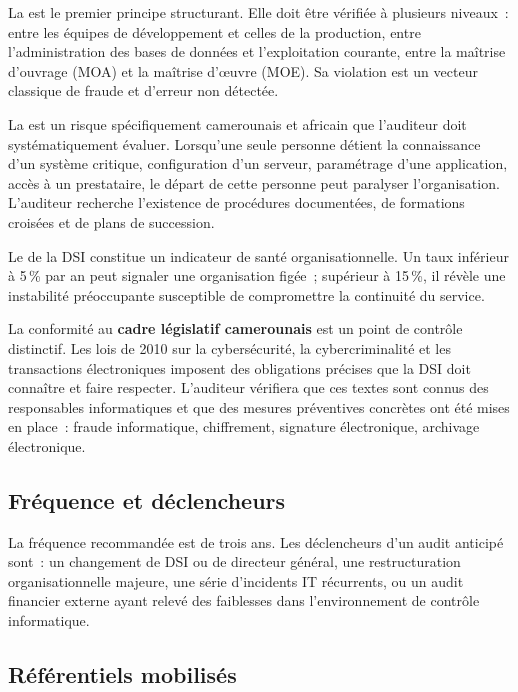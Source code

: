 La  est le premier principe structurant. Elle doit
être vérifiée à plusieurs niveaux~: entre les équipes de développement et celles
de la production, entre l'administration des bases de données et l'exploitation
courante, entre la maîtrise d'ouvrage (MOA) et la maîtrise d'œuvre (MOE). Sa
violation est un vecteur classique de fraude et d'erreur non détectée.

La  est un risque spécifiquement camerounais
et africain que l'auditeur doit systématiquement évaluer. Lorsqu'une seule personne
détient la connaissance d'un système critique, configuration d'un serveur, paramétrage
d'une application, accès à un prestataire, le départ de cette personne peut paralyser
l'organisation. L'auditeur recherche l'existence de procédures documentées, de
formations croisées et de plans de succession.

Le  de la DSI constitue un indicateur de santé organisationnelle.
Un taux inférieur à 5\,\% par an peut signaler une organisation figée~; supérieur
à 15\,\%, il révèle une instabilité préoccupante susceptible de compromettre la
continuité du service.

La conformité au \textbf{cadre législatif camerounais} est un point de contrôle
distinctif. Les lois de 2010 sur la cybersécurité, la cybercriminalité et les
transactions électroniques imposent des obligations précises que la DSI doit
connaître et faire respecter. L'auditeur vérifiera que ces textes sont connus des
responsables informatiques et que des mesures préventives concrètes ont été mises
en place~: fraude informatique, chiffrement, signature électronique, archivage
électronique.

\subsection{Fréquence et déclencheurs}

La fréquence recommandée est de trois ans. Les déclencheurs d'un audit anticipé
sont~: un changement de DSI ou de directeur général, une restructuration
organisationnelle majeure, une série d'incidents IT récurrents, ou un audit
financier externe ayant relevé des faiblesses dans l'environnement de contrôle
informatique.

\subsection{Référentiels mobilisés}

